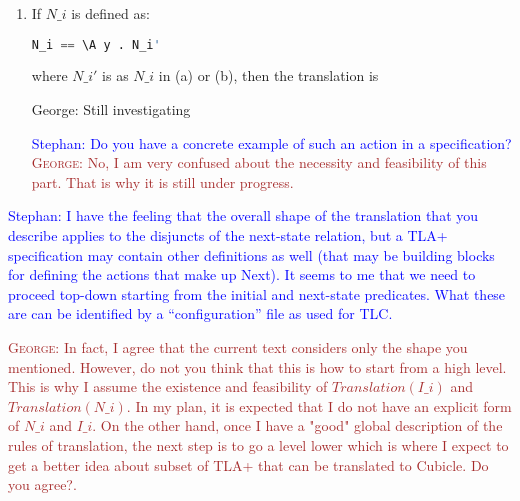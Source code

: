 \documentclass{article}
\theoremstyle{plain}
\numberwithin{equation}{section}
\newcommand{\george}[1]{\textcolor{brown}{\textsc{George: } {\sf #1}}}
\newcommand{\ste}[1]{\par\noindent\textcolor{blue}{\small Stephan: #1}}
\begin{document}
\begin{enumerate}
where $S1(y1,..,yb)$  and $S2(y1,..,yb,y1',..,yb')$  are a state predicate and a next-state relation respectively, i.e., $S1$ describes the preconditioning and $S2$ defined the probed variables. Then  $N\_i$ is translated to: 

\begin{lstlisting}[language=Java]
transition N_i (y1 ... yb) 

requires {  Translation(S1) }
{ Translation(S2(y1,..,yb,y1,..,yb)) }

\end{lstlisting}

\ste{In fact, the S1 and S2 parts contain the variables xi as above as well as
  the parameters yj, but the latter only unprimed.}
  \george{To be discussed}

\item If  $N\_i$ is defined as:
\begin{lstlisting}[language=Python]
N_i == \A y . N_i' 
\end{lstlisting}
where $N\_i' $ is as $N\_i$  in (a) or (b), then the translation is 

\color{red} George: Still investigating \color{black}

\ste{Do you have a concrete example of such an action in a specification?}
\george{No,  I am very confused about the necessity and feasibility of this part. That is why it is still under progress. }
\end{enumerate}

\ste{I have the feeling that the overall shape of the translation that you
  describe applies to the disjuncts of the next-state relation, but a TLA+
  specification may contain other definitions as well (that may be building
  blocks for defining the actions that make up Next). It seems to me that we
  need to proceed top-down starting from the initial and next-state predicates.
  What these are can be identified by a ``configuration'' file as used for TLC.}

  \george{In fact, I agree that the current text considers only the shape you mentioned. However, do not you think that this is how to start from a high level. This is why I assume the existence and feasibility of \emph{$Translation(I\_i)$} and \emph{$Translation(N\_i)$}. In my plan, it is expected that I do not have an explicit form of $N\_i$ and $I\_i$. On the other hand, once I have a "good" global description of the rules of translation, the next step is to go a level lower which is where I expect to get a better idea about subset of TLA+ that can be translated to Cubicle. Do you agree?. }




\fi
\end{document}
